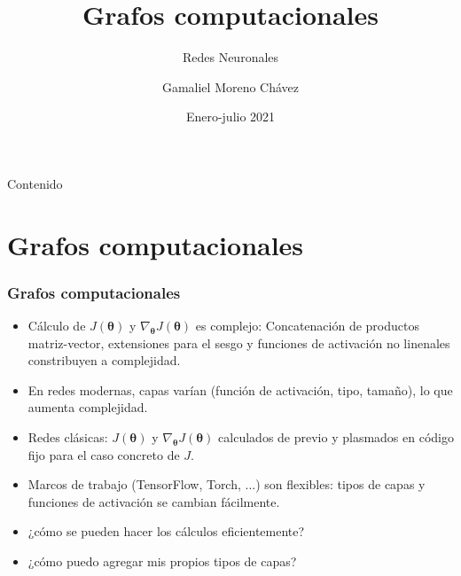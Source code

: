 \documentclass{beamer}
\title{Grafos computacionales}
\subtitle{Redes Neuronales}
\author{Gamaliel Moreno Chávez}
\date{Enero-julio 2021}
\institute{\url{gamalielmch@uaz.edu.mx}}
\begin{document}
\begin{frame}[plain,t]
\titlepage
\end{frame}
\begin{frame}{Contenido} 
   \tableofcontents
\end{frame}

\section{Grafos computacionales}
\begin{frame}
\frametitle{Grafos computacionales}
\begin{itemize}
\item Cálculo de $ J(\boldsymbol{\theta})$ y $\nabla_{\boldsymbol{\theta}}J(\boldsymbol{\theta})$ es complejo: Concatenación de productos matriz-vector, extensiones para el sesgo y funciones de activación no linenales constribuyen a complejidad.
\item En redes modernas, capas varían (función de activación, tipo, tamaño), lo que aumenta complejidad.
\item Redes clásicas: $ J(\boldsymbol{\theta})$ y $\nabla_{\boldsymbol{\theta}}J(\boldsymbol{\theta})$ calculados de previo y plasmados en código fijo para el caso concreto de $J$.
\item Marcos de trabajo (TensorFlow, Torch, ...) son flexibles: tipos de capas y funciones de activación se cambian fácilmente.
\item ¿cómo se pueden hacer los cálculos eficientemente?
\item¿cómo puedo agregar mis propios tipos de capas?
\end{itemize}
\end{frame}
\end{document}
